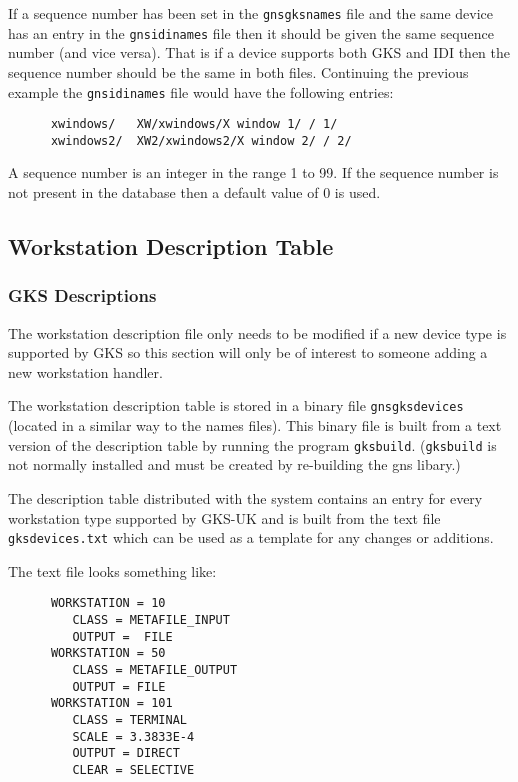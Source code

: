 \documentclass[twoside,11pt]{article}
\renewcommand{\_}{\texttt{\symbol{95}}}
\begin{document}
If a sequence number has been set in the {\tt gns\_gksnames} file and the same
device has an entry in the {\tt gns\_idinames} file then it should be given
the same sequence number (and vice versa). That is if a device supports
both GKS and IDI then the sequence number should be the same in both files.
Continuing the previous example the {\tt gns\_idinames} file would have
the following entries:
\begin{verbatim}
      xwindows/   XW/xwindows/X window 1/ / 1/
      xwindows2/  XW2/xwindows2/X window 2/ / 2/
\end{verbatim}

A sequence number is an integer in the range 1 to 99. If the sequence number
is not present in the database then a default value of 0 is used.

\subsection{Workstation Description Table}\label{wdt}

\subsubsection{GKS Descriptions}

The workstation description file only needs to be modified if a new device type
is supported by GKS so this section will only be of interest to someone adding
a new workstation handler.

The workstation description table is stored in a binary file
{\tt gns\_gksdevices} (located in a similar way to the names files).
This binary file is built from a text version of the
description table by running the program {\tt gksbuild}. ({\tt gksbuild}
is not normally installed and must be created by re-building the
gns libary.)

The description table distributed with the system contains an entry for every
workstation type supported by GKS-UK and is built from the text file {\tt
gksdevices.txt} which can be used as a template for any changes or
additions.

The text file looks something like:

\begin{verbatim}
      WORKSTATION = 10
         CLASS = METAFILE_INPUT
         OUTPUT =  FILE
      WORKSTATION = 50
         CLASS = METAFILE_OUTPUT
         OUTPUT = FILE
      WORKSTATION = 101
         CLASS = TERMINAL
         SCALE = 3.3833E-4
         OUTPUT = DIRECT
         CLEAR = SELECTIVE
\end{verbatim}
\end{document}
